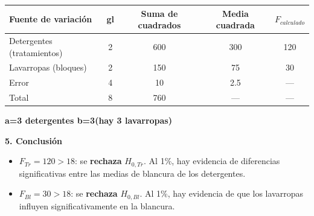 \documentclass[10pt,a4paper]{article}
\begin{document}
\begin{center}
\vspace{-2pt}
{\small
\begin{tabular}{l c c c c}
\toprule
\textbf{Fuente de variación} & \textbf{gl} & \textbf{Suma de cuadrados} & \textbf{Media cuadrada} & $F_{calculado}$ \\
\midrule
Detergentes (tratamientos) & 2 & 600 & 300 & 120 \\
Lavarropas (bloques) & 2 & 150 & 75 & 30 \\
Error & 4 & 10 & 2.5 & --- \\
\midrule
Total & 8 & 760 & --- & --- \\
\bottomrule
\end{tabular}
}
\end{center}

\hfill\textbf{a=3 detergentes \quad b=3(hay 3 lavarropas)}

\textbf{5. Conclusión}
\begin{itemize}[leftmargin=16pt,itemsep=1pt,topsep=1pt,parsep=0pt]
  \item $F_{Tr}=120>18$: se \textbf{rechaza} $H_{0,Tr}$. Al 1\%, hay evidencia de diferencias significativas entre las medias de blancura de los detergentes.
  \item $F_{Bl}=30>18$: se \textbf{rechaza} $H_{0,Bl}$. Al 1\%, hay evidencia de que los lavarropas influyen significativamente en la blancura.
\end{itemize}
\end{document}
